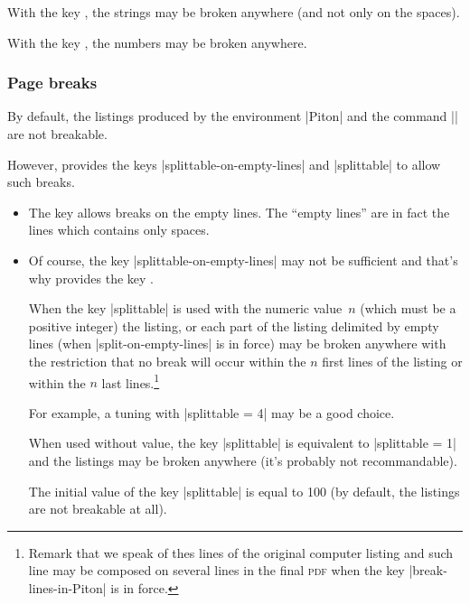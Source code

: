 \documentclass{article}
\begin{document}
\bigskip
With the key , the strings may be broken
anywhere (and not only on the spaces). 

\bigskip
With the key , the numbers may be broken
anywhere.

\subsubsection{Page breaks}
\label{page breaks}
\label{splittable}

By default, the listings produced by the environment |{Piton}| and the command
|\PitonInputFile| are not breakable.

However,  provides the keys |splittable-on-empty-lines| and
|splittable| to allow such breaks.

\begin{itemize}
\item The key  allows breaks on the empty
lines. The ``empty lines'' are in fact the lines which contains only spaces.

\item Of course, the key |splittable-on-empty-lines| may not be sufficient and
that's why  provides the key .

When the key |splittable| is used with the numeric value~$n$ (which must be a
positive integer) the listing, or each part of the listing delimited by empty
lines (when |split-on-empty-lines| is in force) may be broken anywhere with
the restriction that no break will occur within the $n$ first lines of
the listing or within the $n$ last lines.\footnote{Remark that we speak of thes
lines of the original computer listing and such line may be composed on
several lines in the final \textsc{pdf} when the key |break-lines-in-Piton| is
in force.} 

For example, a tuning with |splittable = 4| may be a good choice.

When used without value, the key |splittable| is equivalent to 
|splittable = 1| and the listings may be broken anywhere (it's probably 
not recommandable).

The initial value of the key |splittable| is equal to 100 (by default, the
listings are not breakable at all).
\end{itemize} 
\end{document}
